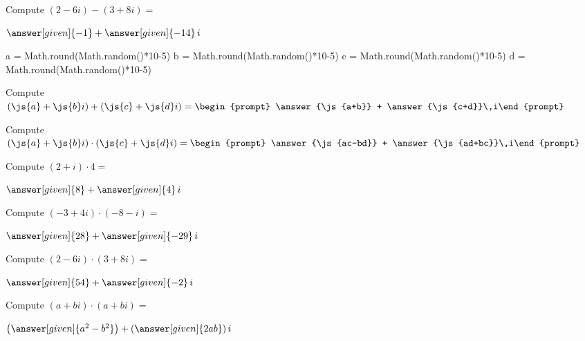 \documentclass[nooutcomes]{ximera}
\begin{document}
\begin{problem}
Compute $(2-6i) - (3+8i) =$ 
\begin{prompt}
	$\answer[given]{-1} + \answer[given]{-14}\,i$
\end{prompt}
\end{problem}

\begin{javascript}
  a = Math.round(Math.random()*10-5)
  b = Math.round(Math.random()*10-5)
  c = Math.round(Math.random()*10-5)
  d = Math.round(Math.random()*10-5)
\end{javascript}

\begin{problem}
Compute $(\js{a}+\js{b}i)+(\js{c}+\js{d}i) = \begin{prompt} \answer{\js{a+b}} + \answer{\js{c+d}}\,i\end{prompt}$
\end{problem}

\begin{problem}
Compute $(\js{a}+\js{b}i)\cdot(\js{c}+\js{d}i) = \begin{prompt} \answer{\js{ac-bd}} + \answer{\js{ad+bc}}\,i\end{prompt}$
\end{problem}


\begin{problem}
Compute $(2+i) \cdot 4 =$
\begin{prompt}
	$\answer[given]{8} + \answer[given]{4}\,i$
\end{prompt}
\end{problem}



\begin{problem}
Compute $(-3 + 4i) \cdot (-8 - i) =$
\begin{prompt}
	$\answer[given]{28} + \answer[given]{-29}\,i$
\end{prompt}
\end{problem}




\begin{problem}
Compute $(2-6i) \cdot (3+8i)=$
\begin{prompt}
	$\answer[given]{54} + \answer[given]{-2}\,i$
\end{prompt}
\end{problem}


\begin{problem}
Compute $(a+bi) \cdot (a+bi)=$
\begin{prompt}
	$\left(\answer[given]{a^2-b^2}\right) + \left(\answer[given]{2ab}\right)i$
\end{prompt}
\end{problem}
\end{document}

